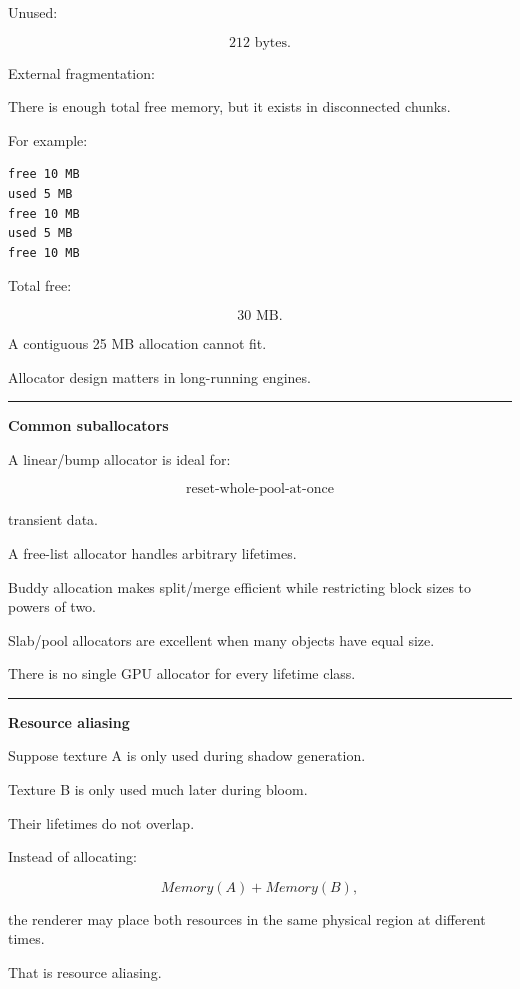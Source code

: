 Unused:

\[
212\text{ bytes}.
\]

External fragmentation:

There is enough total free memory, but it exists in disconnected chunks.

For example:

\protect{}\label{p10-frag}%
\begin{verbatim}
free 10 MB
used 5 MB
free 10 MB
used 5 MB
free 10 MB
\end{verbatim}

Total free:

\[
30\text{ MB}.
\]

A contiguous 25 MB allocation cannot fit.

Allocator design matters in long-running engines.

\begin{center}\rule{0.5\linewidth}{0.5pt}\end{center}

\textbf{Common suballocators}

A linear/bump allocator is ideal for:

\[
\text{reset-whole-pool-at-once}
\]

transient data.

A free-list allocator handles arbitrary lifetimes.

Buddy allocation makes split/merge efficient while restricting block sizes to powers of two.

Slab/pool allocators are excellent when many objects have equal size.

There is no single GPU allocator for every lifetime class.

\begin{center}\rule{0.5\linewidth}{0.5pt}\end{center}

\textbf{Resource aliasing}

Suppose texture A is only used during shadow generation.

Texture B is only used much later during bloom.

Their lifetimes do not overlap.

Instead of allocating:

\[
Memory(A)+Memory(B),
\]

the renderer may place both resources in the same physical region at different times.

That is resource aliasing.

